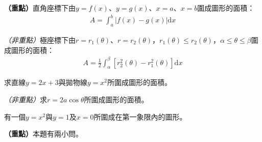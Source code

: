 \documentclass[12pt, addpoints]{exam}
\def \important{\textbf{（重點）}}
\def \unimportant{\textit{（非重點）}}
\def \d{\mathrm{d}}
\begin{document}
\begin{questions}

\question
\important 直角座標下由$y=f(x)$、$y=g(x)$、$x=a$、$x=b$圍成圖形的面積：
\begin{align*}
    A=\int_a^b \left| f(x)-g(x) \right| \d x
\end{align*}

\unimportant 極座標下由$r=r_1(\theta)$、$r=r_2(\theta)$，$r_1(\theta) \leq r_2(\theta)$，$\alpha \leq \theta \leq \beta$圍成圖形的面積：
\begin{align*}
    A=\frac{1}{2}\int_{\alpha}^{\beta} \left[ r_2^2(\theta) - r_1^2(\theta) \right] \d x
\end{align*}

\question[1]
求直線$y=2x+3$與拋物線$y=x^2$所圍成圖形的面積。

\bonusquestion
\unimportant 求$r=2a \cos \theta$所圍成圖形的面積。

\newpage %

\question
有一個$y=x^2$與$y=1$及$x=0$所圍成在第一象限內的圖形。

\newpage %

\question
\important 本題有兩小問。
\begin{parts}


\end{parts}
\end{questions}
\end{document}
